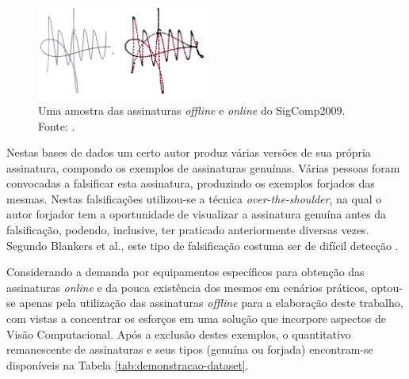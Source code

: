 \begin{figure}[h!]
\centering
\caption{Uma amostra das assinaturas \emph{offline} e \emph{online} do SigComp2009. Fonte: \cite{icdar2009}.}
\label{fig:sample-signature}
\includegraphics[width=0.5\textwidth]{imgs/sample-signature}
\end{figure}

Nestas bases de dados um certo autor produz várias versões de sua própria assinatura, compondo os exemplos de assinaturas genuínas. Várias pessoas foram convocadas a falsificar esta assinatura, produzindo os exemplos forjados das mesmas. Nestas falsificações utilizou-se a técnica \emph{over-the-shoulder}, na qual o autor forjador tem a oportunidade de visualizar a assinatura genuína antes da falsificação, podendo, inclusive, ter praticado anteriormente diversas vezes. Segundo Blankers et al., este tipo de falsificação costuma ser de difícil detecção \cite{icdar2009}.

Considerando a demanda por equipamentos específicos para obtenção das assinaturas \emph{online} e da pouca existência dos mesmos em cenários práticos, optou-se apenas pela utilização das assinaturas \emph{offline} para a elaboração deste trabalho, com vistas a concentrar os esforços em uma solução que incorpore aspectos de Visão Computacional. Após a exclusão destes exemplos, o quantitativo remanescente de assinaturas e seus tipos (genuína ou forjada) encontram-se disponíveis na Tabela \ref{tab:demonstracao-dataset}.

\begin{table}[h!]
	\centering
	\caption{Quantitativo de indivíduos e assinaturas \emph{offline} por conjunto de dados.}
	\label{tab:demonstracao-dataset}
\end{table}

